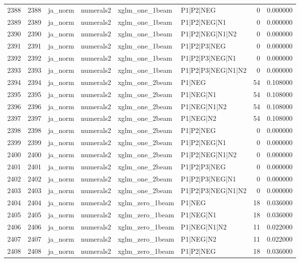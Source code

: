 \begin{tabular}{lrllllrr}
2388 & 2388 & ja_norm & numerals2 & xglm_one_1beam & P1|P2|NEG & 0 & 0.000000 \\
2389 & 2389 & ja_norm & numerals2 & xglm_one_1beam & P1|P2|NEG|N1 & 0 & 0.000000 \\
2390 & 2390 & ja_norm & numerals2 & xglm_one_1beam & P1|P2|NEG|N1|N2 & 0 & 0.000000 \\
2391 & 2391 & ja_norm & numerals2 & xglm_one_1beam & P1|P2|P3|NEG & 0 & 0.000000 \\
2392 & 2392 & ja_norm & numerals2 & xglm_one_1beam & P1|P2|P3|NEG|N1 & 0 & 0.000000 \\
2393 & 2393 & ja_norm & numerals2 & xglm_one_1beam & P1|P2|P3|NEG|N1|N2 & 0 & 0.000000 \\
2394 & 2394 & ja_norm & numerals2 & xglm_one_2beam & P1|NEG & 54 & 0.108000 \\
2395 & 2395 & ja_norm & numerals2 & xglm_one_2beam & P1|NEG|N1 & 54 & 0.108000 \\
2396 & 2396 & ja_norm & numerals2 & xglm_one_2beam & P1|NEG|N1|N2 & 54 & 0.108000 \\
2397 & 2397 & ja_norm & numerals2 & xglm_one_2beam & P1|NEG|N2 & 54 & 0.108000 \\
2398 & 2398 & ja_norm & numerals2 & xglm_one_2beam & P1|P2|NEG & 0 & 0.000000 \\
2399 & 2399 & ja_norm & numerals2 & xglm_one_2beam & P1|P2|NEG|N1 & 0 & 0.000000 \\
2400 & 2400 & ja_norm & numerals2 & xglm_one_2beam & P1|P2|NEG|N1|N2 & 0 & 0.000000 \\
2401 & 2401 & ja_norm & numerals2 & xglm_one_2beam & P1|P2|P3|NEG & 0 & 0.000000 \\
2402 & 2402 & ja_norm & numerals2 & xglm_one_2beam & P1|P2|P3|NEG|N1 & 0 & 0.000000 \\
2403 & 2403 & ja_norm & numerals2 & xglm_one_2beam & P1|P2|P3|NEG|N1|N2 & 0 & 0.000000 \\
2404 & 2404 & ja_norm & numerals2 & xglm_zero_1beam & P1|NEG & 18 & 0.036000 \\
2405 & 2405 & ja_norm & numerals2 & xglm_zero_1beam & P1|NEG|N1 & 18 & 0.036000 \\
2406 & 2406 & ja_norm & numerals2 & xglm_zero_1beam & P1|NEG|N1|N2 & 11 & 0.022000 \\
2407 & 2407 & ja_norm & numerals2 & xglm_zero_1beam & P1|NEG|N2 & 11 & 0.022000 \\
2408 & 2408 & ja_norm & numerals2 & xglm_zero_1beam & P1|P2|NEG & 18 & 0.036000 \\

\end{tabular}
